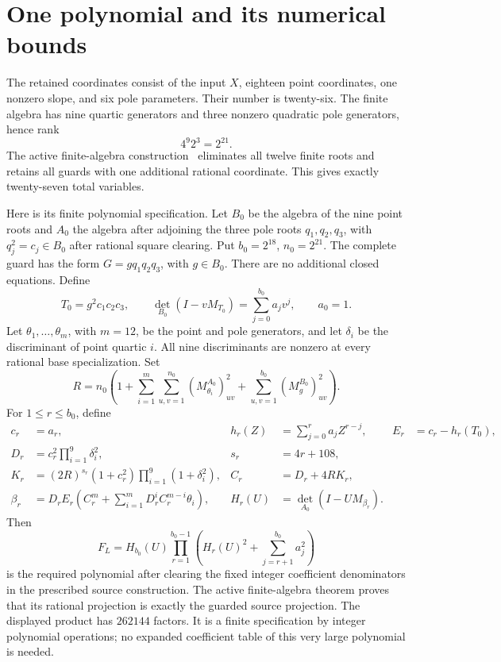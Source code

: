 \documentclass[11pt,a4paper]{article}
\begin{document}
\section{One polynomial and its numerical bounds}

The retained coordinates consist of the input $X$, eighteen point
coordinates, one nonzero slope, and six pole parameters. Their
number is twenty-six. The finite algebra has nine quartic generators
and three nonzero quadratic pole generators, hence rank
\[
                             4^9 2^3=2^{21}.
\]
The active finite-algebra construction~\cite{Active} eliminates all
twelve finite roots and retains all guards with one additional
rational coordinate. This gives exactly twenty-seven total variables.

Here is its finite polynomial specification. Let $B_0$ be the
algebra of the nine point roots and $A_0$ the algebra after adjoining
the three pole roots $q_1,q_2,q_3$, with $q_j^2=c_j\in B_0$
after rational square clearing. Put $b_0=2^{18}$, $n_0=2^{21}$.
The complete guard has the form $G=gq_1q_2q_3$, with $g\in B_0$.
There are no additional closed equations. Define
\[
 T_0=g^2c_1c_2c_3,\qquad
 \det_{B_0}(I-vM_{T_0})=\sum_{j=0}^{b_0}a_jv^j,\qquad a_0=1.
\]
Let $\theta_1,\ldots,\theta_m$, with $m=12$, be the point and
pole generators, and let $\delta_i$ be the discriminant of point
quartic $i$. All nine discriminants are nonzero at every rational
base specialization. Set
\[
 R=n_0\left(1+\sum_{i=1}^{m}\sum_{u,v=1}^{n_0}
       (M_{\theta_i}^{A_0})_{uv}^2+
       \sum_{u,v=1}^{b_0}(M_g^{B_0})_{uv}^2\right).
\]
For $1\le r\le b_0$, define
\begin{align*}
 c_r&=a_r,&h_r(Z)&=\sum_{j=0}^r a_jZ^{r-j},&E_r&=c_r-h_r(T_0),\\
 D_r&=c_r^2\prod_{i=1}^9\delta_i^2,&s_r&=4r+108,\\
 K_r&=(2R)^{s_r}(1+c_r^2)\prod_{i=1}^9(1+\delta_i^2),&
 C_r&=D_r+4RK_r,\\
 \beta_r&=D_rE_r\left(C_r^m+
             \sum_{i=1}^m D_r^iC_r^{m-i}\theta_i\right),&
 H_r(U)&=\det_{A_0}(I-UM_{\beta_r}).
\end{align*}
Then
\begin{equation}\label{eq:polynomial}
 F_L=H_{b_0}(U)\prod_{r=1}^{b_0-1}
                 \left(H_r(U)^2+\sum_{j=r+1}^{b_0}a_j^2\right)
\end{equation}
is the required polynomial after clearing the fixed integer coefficient
denominators in the prescribed source construction. The active
finite-algebra theorem proves that its rational projection is exactly
the guarded source projection. The displayed product has $262144$
factors. It is a finite specification by integer polynomial operations;
no expanded coefficient table of this very large polynomial is needed.
\end{document}
